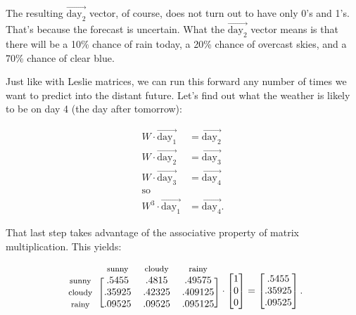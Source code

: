 \begin{alttitles}
The resulting $\overrightarrow{\textrm{day}_2}$ vector, of course, does not
turn out to have only 0's and 1's. That's because the forecast is uncertain.
What the $\overrightarrow{\textrm{day}_2}$ vector means is that there will be a
10\% chance of rain today, a 20\% chance of overcast skies, and a 70\% chance
of clear blue.

Just like with Leslie matrices, we can run this forward any number of times we
want to predict into the distant future. Let's find out what the weather is
likely to be on day 4 (the day after tomorrow):

\vspace{-.15in}
\begin{align*}
W \cdot \overrightarrow{\textrm{day}_1} &= \overrightarrow{\textrm{day}_2} \\
W \cdot \overrightarrow{\textrm{day}_2} &= \overrightarrow{\textrm{day}_3} \\
W \cdot \overrightarrow{\textrm{day}_3} &= \overrightarrow{\textrm{day}_4} \\
\textrm{so} \\
W^3 \cdot \overrightarrow{\textrm{day}_1} &= \overrightarrow{\textrm{day}_4}.
\end{align*}
\vspace{-.15in}


That last step takes advantage of the associative property of matrix
multiplication. This yields:

\[
\begin{blockarray}{cccccc}
& {\footnotesize\textrm{sunny}} & {\footnotesize\textrm{cloudy}} &
{\footnotesize\textrm{rainy}} \\
\begin{block}{c[ccccc]}
{\footnotesize\textrm{sunny}} & .5455 & .4815 & .49575 \\
{\footnotesize\textrm{cloudy}} & .35925 & .42325 & .409125 \\
{\footnotesize\textrm{rainy}} & .09525 & .09525 & .095125 \\
\end{block}
\end{blockarray} \cdot
\begin{bmatrix}
1 \\ 0 \\ 0 \\
\end{bmatrix} =
\begin{bmatrix}
.5455 \\ .35925 \\ .09525
\end{bmatrix}.
\]


\end{alttitles}
